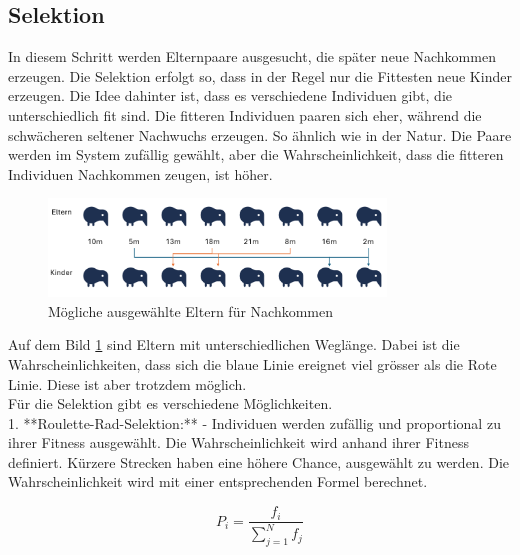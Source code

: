%
%
%
%
\subsection{Selektion
\label{buch:paper:varalg:subsection:selection}}
In diesem Schritt werden Elternpaare ausgesucht, die später 
neue Nachkommen erzeugen. Die Selektion erfolgt so, dass in der 
Regel nur die Fittesten neue Kinder erzeugen.
Die Idee dahinter ist, dass es verschiedene Individuen gibt, 
die unterschiedlich fit sind. Die fitteren Individuen paaren 
sich eher, während die schwächeren seltener Nachwuchs erzeugen. 
So ähnlich wie in der Natur. Die Paare werden im System zufällig 
gewählt, aber die Wahrscheinlichkeit, dass die fitteren 
Individuen Nachkommen zeugen, ist höher.

\begin{figure}
    \centering
    \includegraphics[width=0.8\textwidth]{
        papers/varalg/images/teil3/04OffspringProbability.png
    }
    \caption{Mögliche ausgewählte Eltern für Nachkommen}
    \label{fig:selection_of_parents}
\end{figure}
Auf dem Bild \ref{fig:selection_of_parents} sind Eltern mit unterschiedlichen
Weglänge. Dabei ist die Wahrscheinlichkeiten, dass sich die blaue Linie ereignet 
viel grösser als die Rote Linie. Diese ist aber trotzdem möglich.
\\
Für die Selektion gibt es verschiedene Möglichkeiten.
\\
1. **Roulette-Rad-Selektion:** 
- Individuen werden zufällig und proportional zu ihrer 
Fitness ausgewählt. Die Wahrscheinlichkeit wird anhand ihrer 
Fitness definiert. Kürzere Strecken haben eine höhere Chance, 
ausgewählt zu werden. Die Wahrscheinlichkeit wird mit einer 
entsprechenden Formel berechnet.

\begin{equation}
    \label{eq:probability_fittest}
    P_i = \frac{f_i}{\sum_{j=1}^{N} f_j}
\end{equation}

